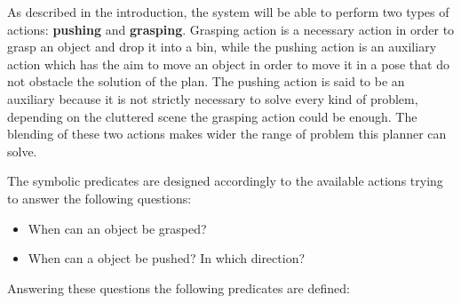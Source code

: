 As described in the introduction, the system will be able to perform two types of actions: \textbf{pushing} and \textbf{grasping}.
Grasping action is a necessary action in order to grasp an object and drop it into a bin, while the pushing action is an auxiliary action which has the aim to move an object in order to move it in a pose that do not obstacle the solution of the plan. 
The pushing action is said to be an auxiliary because it is not strictly necessary to solve every kind of problem, depending on the cluttered scene the grasping action could be enough.
The blending of these two actions makes wider the range of problem this planner can solve.    

The symbolic predicates are designed accordingly to the available actions trying to answer the following questions:
\begin{itemize}
\item When can an object be grasped? 
\item When can a object be pushed? In which direction? 
\end{itemize}
Answering these questions the following predicates are defined:


